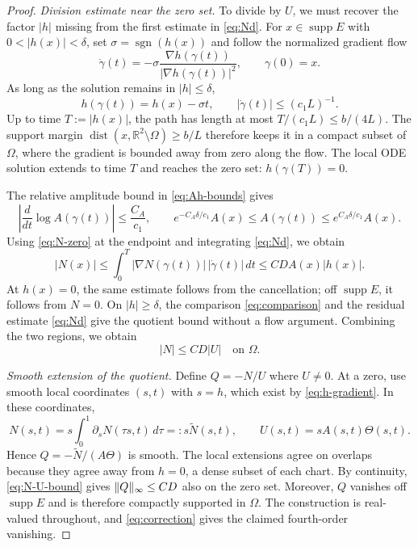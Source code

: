\documentclass[11pt,a4paper,leqno]{amsart}
\numberwithin{equation}{section}
\theoremstyle{landisplain}
\theoremstyle{landisdefinition}
\theoremstyle{landisremark}
\newcommand{\R}{\mathbb R}
\newcommand{\pa}{\partial}
\newcommand{\supp}{\operatorname{supp}}
\newcommand{\dist}{\operatorname{dist}}
\newcommand{\sgn}{\operatorname{sgn}}
\DeclarePairedDelimiter{\norm}{\lVert}{\rVert}
\begin{document}
\begin{proof}
\smallskip\noindent\emph{Division estimate near the zero set.}
To divide by $U$, we must recover the factor $|h|$ missing
from the first estimate in \eqref{eq:Nd}. For
$x\in\supp E$ with $0<|h(x)|<\delta$, set
$\sigma=\sgn(h(x))$ and follow the normalized gradient flow
\begin{equation}\label{eq:flow}
 \dot\gamma(t)=-\sigma\frac{\nabla h(\gamma(t))}
                                  {|\nabla h(\gamma(t))|^2},
 \qquad \gamma(0)=x.
\end{equation}
As long as the solution remains in $|h|\le\delta$,
\[
 h(\gamma(t))=h(x)-\sigma t,
 \qquad |\dot\gamma(t)|\le(c_1L)^{-1}.
\]
Up to time $T:=|h(x)|$, the path has length at most
$T/(c_1L)\le b/(4L)$. The support margin
$\dist(x,\R^2\setminus\Omega)\ge b/L$ therefore keeps it in
a compact subset of $\Omega$, where the gradient is bounded away
from zero along the flow. The local ODE solution extends to time
$T$ and reaches the zero set: $h(\gamma(T))=0$.

The relative amplitude bound in \eqref{eq:Ah-bounds} gives
\[
 \left|\frac{d}{dt}\log A(\gamma(t))\right|
 \le \frac{C_A}{c_1},\qquad
 e^{-C_A\delta/c_1}A(x)\le A(\gamma(t))
                         \le e^{C_A\delta/c_1}A(x).
\]
Using \eqref{eq:N-zero} at the endpoint and integrating
\eqref{eq:Nd}, we obtain
\begin{equation}\label{eq:N-division}
 |N(x)|\le\int_0^T|\nabla N(\gamma(t))|\,|\dot\gamma(t)|\,dt
 \le CDA(x)|h(x)|.
\end{equation}
At $h(x)=0$, the same estimate follows from the cancellation;
off $\supp E$, it follows from $N=0$. On $|h|\ge\delta$,
the comparison \eqref{eq:comparison} and the residual estimate
\eqref{eq:Nd} give the quotient bound without a flow argument.
Combining the two regions, we obtain
\begin{equation}\label{eq:N-U-bound}
 |N|\le CD|U|\quad\text{on }\Omega.
\end{equation}

\smallskip\noindent\emph{Smooth extension of the quotient.}
Define $Q=-N/U$ where $U\ne0$. At a zero, use smooth local
coordinates $(s,t)$ with $s=h$, which exist by
\eqref{eq:h-gradient}. In these coordinates,
\[
 N(s,t)=s\int_0^1\pa_sN(\tau s,t)\,d\tau=:s\widetilde N(s,t),
 \qquad U(s,t)=sA(s,t)\Theta(s,t).
\]
Hence $Q=-\widetilde N/(A\Theta)$ is smooth. The local
extensions agree on overlaps because they agree away from $h=0$,
a dense subset of each chart. By continuity,
\eqref{eq:N-U-bound} gives $\norm Q_\infty\le CD$ also on
the zero set. Moreover, $Q$ vanishes off $\supp E$ and is
therefore compactly supported in $\Omega$. The construction is
real-valued throughout, and \eqref{eq:correction} gives the
claimed fourth-order vanishing.
\end{proof}
\end{document}
